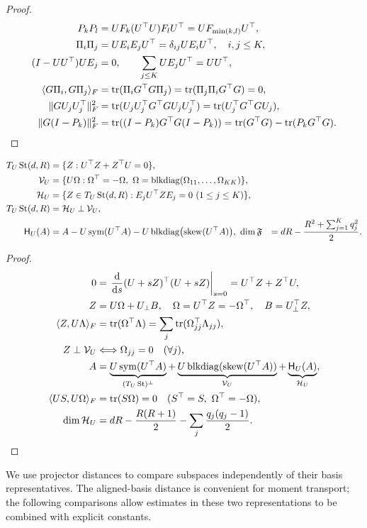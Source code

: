 \begin{proof}
\begin{align}
 P_kP_l&=UF_k(U^\top U)F_lU^\top=UF_{\min(k,l)}U^\top,\\
 \Pi_i\Pi_j&=UE_iE_jU^\top=\delta_{ij}UE_iU^\top,\quad i,j\le K,\\
 (I-UU^\top)UE_j&=0,\qquad
 \sum_{j\le K}UE_jU^\top=UU^\top,\\
 \langle G\Pi_i,G\Pi_j\rangle_F
 &=\operatorname{tr}(\Pi_iG^\top G\Pi_j)
 =\operatorname{tr}(\Pi_j\Pi_iG^\top G)=0,\\
 \|GU_jU_j^\top\|_F^2
 &=\operatorname{tr}(U_jU_j^\top G^\top GU_jU_j^\top)
 =\operatorname{tr}(U_j^\top G^\top GU_j),\\
 \|G(I-P_k)\|_F^2
 &=\operatorname{tr}((I-P_k)G^\top G(I-P_k))
 =\operatorname{tr}(G^\top G)-\operatorname{tr}(P_kG^\top G).
\end{align}
\end{proof}
\begin{proposition}\label{prop:rigid-horizontal}
\begin{align}
 T_U\operatorname{St}(d,R)&=\{Z:U^\top Z+Z^\top U=0\},\\
 \mathcal V_U&=\{U\Omega:\Omega^\top=-\Omega,
                  \ \Omega=\operatorname{blkdiag}(\Omega_{11},\ldots,\Omega_{KK})\},\\
 \mathcal H_U&=\{Z\in T_U\operatorname{St}(d,R):E_jU^\top ZE_j=0\ (1\le j\le K)\},\\
 T_U\operatorname{St}(d,R)&=\mathcal H_U\mathbin{\perp}\mathcal V_U,\\
 \mathsf H_U(A)&=A-U\operatorname{sym}(U^\top A)
   -U\operatorname{blkdiag}\bigl(\operatorname{skew}(U^\top A)\bigr),
 \label{eq:rigid-horizontal}\
 \dim\mathfrak F&=dR-\frac{R^2+\sum_{j=1}^Kq_j^2}{2}.
\end{align}
\end{proposition}
\begin{proof}
\begin{align}
 0&=\left.\frac{\mathrm d}{\mathrm ds}(U+sZ)^\top(U+sZ)\right|_{s=0}
   =U^\top Z+Z^\top U,\\
 Z&=U\Omega+U_\perp B,\quad
 \Omega=U^\top Z=-\Omega^\top,\quad B=U_\perp^\top Z,\\
 \langle Z,U\Lambda\rangle_F
 &=\operatorname{tr}(\Omega^\top\Lambda)
 =\sum_j\operatorname{tr}(\Omega_{jj}^\top\Lambda_{jj}),\\
 Z\perp\mathcal V_U&\Longleftrightarrow\Omega_{jj}=0\quad(\forall j),\\
 A&=\underbrace{U\operatorname{sym}(U^\top A)}_{(T_U\operatorname{St})^\perp}
 +\underbrace{U\operatorname{blkdiag}(\operatorname{skew}(U^\top A))}_{\mathcal V_U}
 +\underbrace{\mathsf H_U(A)}_{\mathcal H_U},\\
 \langle U S,U\Omega\rangle_F&=\operatorname{tr}(S\Omega)=0
 \quad(S^\top=S,\ \Omega^\top=-\Omega),\\
 \dim\mathcal H_U&=dR-\frac{R(R+1)}2-\sum_j\frac{q_j(q_j-1)}2.
\end{align}
\end{proof}
We use projector distances to compare subspaces independently of their basis
representatives. The aligned-basis distance is convenient for moment transport;
the following comparisons allow estimates in these two representations to be
combined with explicit constants.

